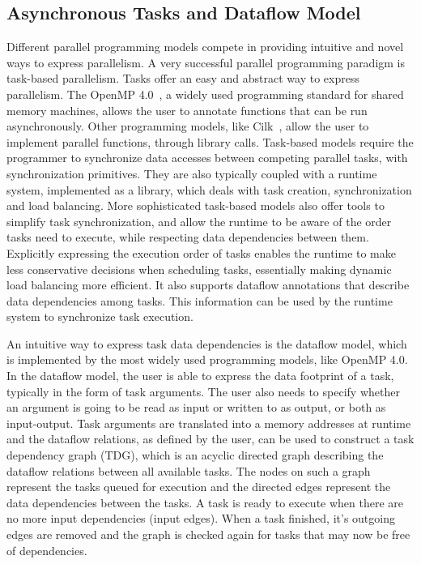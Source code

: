 \subsection{Asynchronous Tasks and Dataflow Model}
\label{sec:task-model}
Different parallel programming models compete in providing intuitive and novel ways to
express parallelism.  A very successful parallel programming paradigm is task-based
parallelism.  Tasks offer an easy and abstract way to express parallelism.  The OpenMP
4.0~\cite{openmp13}, a widely used programming standard for shared memory machines, allows
the user to annotate functions that can be run asynchronously.  Other programming models,
like Cilk~\cite{Lee:2013:OPP:2486159.2486174}, allow the user to implement parallel
functions, through library calls.  Task-based models require the programmer to synchronize
data accesses between competing parallel tasks, with synchronization primitives.  They are
also typically coupled with a runtime system, implemented as a library, which deals with
task creation, synchronization and load balancing.  More sophisticated task-based models
also offer tools to simplify task synchronization, and allow the runtime to be aware of
the order tasks need to execute, while respecting data dependencies between them.
Explicitly expressing the execution order of tasks enables the runtime to make less
conservative decisions when scheduling tasks, essentially making dynamic load balancing
more efficient.  It also supports dataflow annotations that describe data dependencies
among tasks. This information can be used by the runtime system to synchronize task
execution.  

An intuitive way to express task data dependencies is the dataflow model, which is
implemented by the most widely used programming models, like OpenMP 4.0\cite{openmp13}.
In the dataflow model, the user is able to express the data footprint of a task, typically
in the form of task arguments.  The user also needs to specify whether an argument is
going to be read as input or written to as output, or both as input-output.  Task
arguments are translated into a memory addresses at runtime and the dataflow relations, as
defined by the user, can be used to construct a task dependency graph (TDG), which is an
acyclic directed graph describing the dataflow relations between all available tasks.  The
nodes on such a graph represent the tasks queued for execution and the directed edges
represent the data dependencies between the tasks.   A task is ready to execute when there
are no more input dependencies (input edges).  When a task finished, it's outgoing edges
are removed and the graph is checked again for tasks that may now be free of dependencies.
    
